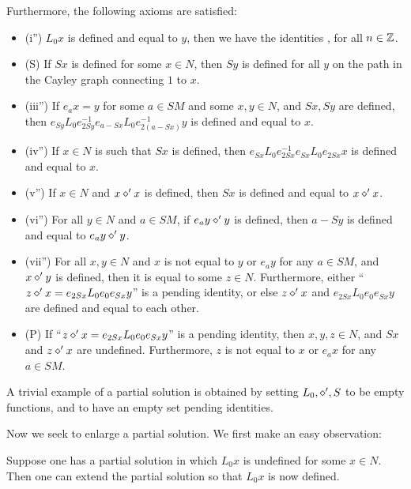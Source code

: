 Furthermore, the following axioms are satisfied:
\begin{itemize}
  \item (i'')  $L_0 x$ is defined and equal to $y$, then we have the identities ,  for all $n\in \mathbb{Z}$.
  \item (S) If $Sx$ is defined for some $x \in N$, then $Sy$ is defined for all $y$ on the path in the Cayley graph connecting $1$ to $x$.
  \item (iii'') If $e_a x = y$ for some $a \in SM$ and some $x,y \in N$, and $Sx, Sy$ are defined, then $e_{Sy} L_0 e_{2Sy}^{-1} e_{a-Sx} L_0 e_{2(a-Sx)}^{-1} y$ is defined and equal to $x$.
  \item (iv'') If $x \in N$ is such that $Sx$ is defined, then $e_{Sx} L_0 e_{2Sx}^{-1} e_{Sx} L_0 e_{2Sx} x$ is defined and equal to $x$.
  \item (v'')  If $x \in N$ and $x \diamond' x$ is defined, then $Sx$ is defined and equal to $x \diamond' x$.
  \item (vi'')  For all $y \in N$ and $a \in SM$, if $e_a y \diamond' y$ is defined, then $a - Sy$ is defined and equal to $e_a y \diamond' y$.
  \item (vii'')  For all $x,y \in N$ and $x$ is not equal to $y$ or $e_a y$ for any $a \in SM$, and $x \diamond' y$ is defined, then it is equal to some $z \in N$.  Furthermore, either ``$z \diamond' x = e_{2Sx} L_0 e_0 e_{Sx} y$'' is a pending identity, or else $z \diamond' x$ and $e_{2Sx} L_0 e_0 e_{Sx} y$ are defined and equal to each other.
  \item (P) If ``$z \diamond' x = e_{2Sx} L_0 e_0 e_{Sx} y$'' is a pending identity, then $x,y,z \in N$, and $Sx$ and $z \diamond' x$ are undefined.  Furthermore, $z$ is not equal to $x$ or $e_a x$ for any $a \in SM$.
\end{itemize}

A trivial example of a partial solution is obtained by setting $L_0, \diamond', S$ to be empty functions, and to have an empty set pending identities.

Now we seek to enlarge a partial solution. We first make an easy observation:

\begin{proposition}[Enlarging $L_0$]\label{enlarge-l0}  Suppose one has a partial solution in which $L_0 x$ is undefined for some $x \in N$.  Then one can extend the partial solution so that $L_0 x$ is now defined.
\end{proposition}

